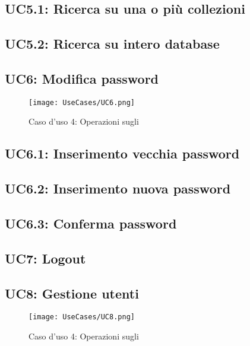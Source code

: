 \documentclass{scalatekids-article}
\begin{document}
\subsection{UC5.1: Ricerca su una o più collezioni}

\subsection{UC5.2: Ricerca su intero database}

\subsection{UC6: Modifica password}

\begin{figure}[H]
  \begin{center}
    \texttt{[image: UseCases/UC6.png]}
    \caption*{Caso d'uso 4: Operazioni sugli }
  \end{center}
\end{figure}

\subsection{UC6.1: Inserimento vecchia password}

\subsection{UC6.2: Inserimento nuova password}

\subsection{UC6.3: Conferma password}

\subsection{UC7: Logout}

\subsection{UC8: Gestione utenti}

\begin{figure}[H]
  \begin{center}
    \texttt{[image: UseCases/UC8.png]}
    \caption*{Caso d'uso 4: Operazioni sugli }
  \end{center}
\end{figure}
\end{document}
